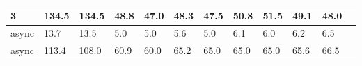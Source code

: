\documentclass[12pt,a4paper]{report}
\begin{document}
\begin{table}[h]
\begin{tabular}{|l|l|l|l|l|l|l|l|l|l|l|l|}
		3                        & 134.5                              & 134.5                           & 48.8                        & 47.0                      & 48.3                           & 47.5   & 50.8 & 51.5   & 49.1 & 48.0   \\ \hline
		async                    & 13.7                               & 13.5                            & 5.0                         & 5.0                       & 5.6                            & 5.0    & 6.1  & 6.0    & 6.2  & 6.5    \\ \hline
		async                    & 113.4                              & 108.0                           & 60.9                        & 60.0                      & 65.2                           & 65.0   & 65.0 & 65.0   & 65.6 & 66.5   \\ \hline
	\end{tabular}
\end{table}
\end{document}
